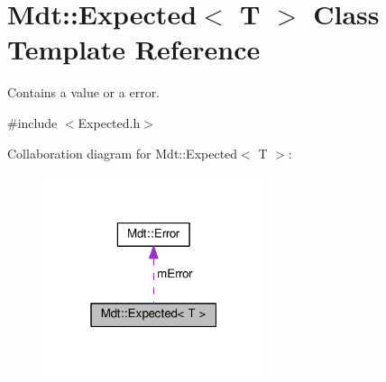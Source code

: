 \hypertarget{class_mdt_1_1_expected}{}\section{Mdt\+:\+:Expected$<$ T $>$ Class Template Reference}
\label{class_mdt_1_1_expected}


Contains a value or a error.  




{\ttfamily \#include $<$Expected.\+h$>$}



Collaboration diagram for Mdt\+:\+:Expected$<$ T $>$\+:\nopagebreak
\begin{figure}[H]
\begin{center}
\leavevmode
\includegraphics[width=184pt]{class_mdt_1_1_expected__coll__graph}
\end{center}
\end{figure}
